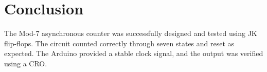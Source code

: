 \documentclass[a4paper,12pt]{article}
\begin{document}
\section{Conclusion}
The Mod-7 asynchronous counter was successfully designed and tested using JK flip-flops. The circuit counted correctly through seven states and reset as expected. The Arduino provided a stable clock signal, and the output was verified using a CRO.
\end{document}
